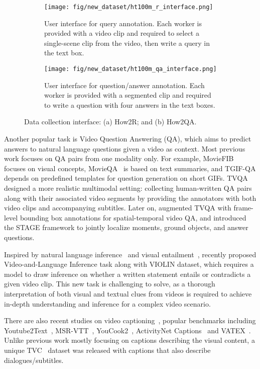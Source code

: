 \documentclass[11pt,a4paper]{article}
\begin{document}
\begin{figure}[t!]
\begin{subfigure}[b]{0.45\textwidth}
\texttt{[image: fig/new\_dataset/ht100m\_r\_interface.png]}
         \caption{User interface for query annotation. Each worker is provided with a video clip and required to select a single-scene clip from the video, then write a query in the text box.}
         \label{fig:query_ui}
     \end{subfigure}
     \begin{subfigure}[b]{0.45\textwidth}
\texttt{[image: fig/new\_dataset/ht100m\_qa\_interface.png]}
         \caption{User interface for question/answer annotation. Each worker is provided with a segmented clip and required to write a question with four answers in the text boxes.}
         \label{fig:qa_ui}
     \end{subfigure}
\caption{\small{Data collection interface: (a) How2R; and (b) How2QA.}}
\end{figure} 
Another popular task is Video Question Answering (QA), which aims to predict answers to natural language questions given a video as context. Most previous work focuses on QA pairs from one modality only. For example, MovieFIB~\citep{maharaj2017dataset} focuses on visual concepts, MovieQA~\citep{tapaswi2016movieqa} is based on text summaries, and TGIF-QA\citep{jang2017tgif} depends on predefined templates for question generation on short GIFs. TVQA~\citep{lei2018tvqa} designed a more realistic multimodal setting: collecting human-written QA pairs along with their associated video segments by providing the annotators with both video clips and accompanying subtitles. Later on, \citet{lei2019tvqaplus} augmented TVQA with frame-level bounding box annotations for spatial-temporal video QA, and introduced the STAGE framework to jointly localize moments, ground objects, and answer questions. 

Inspired by natural language inference~\citep{bowman2015large, williams2017broad} and visual entailment~\citep{xie2019visual}, \citet{liu2020violin} recently proposed Video-and-Language Inference task along with VIOLIN dataset, which requires a model to draw inference on whether a written statement entails or contradicts a given video clip. This new task is challenging to solve, as a thorough interpretation of both visual and textual clues from videos is required to achieve in-depth understanding and inference for a complex video scenario.

There are also recent studies on video captioning~\cite{venugopalan2015sequence,pan2016jointly,gan2017semantic,zhou2018end,zhou2019grounded}, popular benchmarks including Youtube2Text~\cite{guadarrama2013youtube2text}, MSR-VTT~\cite{xu2016msr}, YouCook2~\cite{zhou2018towards}, ActivityNet Captions~\cite{krishna2017dense} and VATEX~\cite{wang2019vatex}. Unlike previous work mostly focusing on captions describing the visual content, a unique TVC~\citep{lei2020tvr} dataset was released with captions that also describe dialogues/subtitles. 
\end{document}
